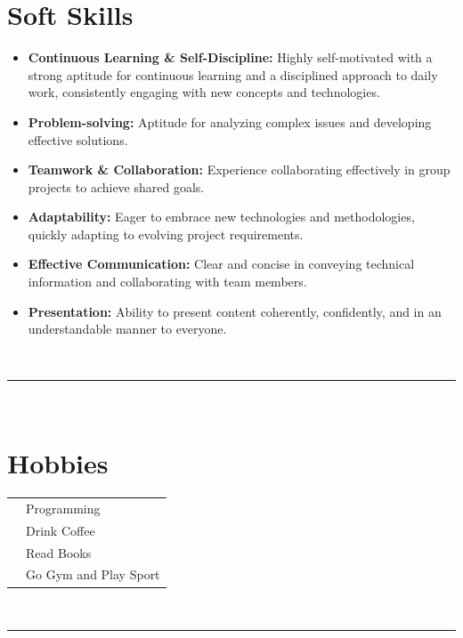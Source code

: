 \documentclass[oneside]{article}
\begin{document}
{\begin{minipage}[t][\dimexpr\textheight-2\fboxrule-2\fboxsep\relax][t]{\dimexpr0.4\textwidth-2\fboxrule-2\fboxsep\relax}
        \section*{\large Soft Skills}
        \begin{itemize}
            \item \textbf{Continuous Learning \& Self-Discipline:} Highly self-motivated with a strong aptitude for continuous learning and a disciplined approach to daily work, consistently engaging with new concepts and technologies.
            \item \textbf{Problem-solving:} Aptitude for analyzing complex issues and developing effective solutions.
            \item \textbf{Teamwork \& Collaboration:} Experience collaborating effectively in group projects to achieve shared goals.
            \item \textbf{Adaptability:} Eager to embrace new technologies and methodologies, quickly adapting to evolving project requirements.
            \item \textbf{Effective Communication:} Clear and concise in conveying technical information and collaborating with team members.
            \item \textbf{Presentation:} Ability to present content coherently, confidently, and in an understandable manner to everyone.
        \end{itemize}
        \vspace{.3cm}
        \\
        \rule{\linewidth}{0.4pt}
        \\
        \section*{\large Hobbies}
        \begin{tabularx}{\textwidth}{cY}
            \faCode{} & Programming \\
            \faCoffee{} & Drink Coffee \\
            \faBook{} & Read Books\\
            \faDumbbell{} & Go Gym and Play Sport \\
        \end{tabularx}
        \vspace{.3cm}
        \\
        \rule{\linewidth}{0.4pt}
        
    \end{minipage}%
}%
\end{document}
